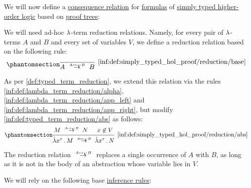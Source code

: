 \begin{definition}\label{def:simply_typed_hol_proof_tree}\mimprovised
  We will now define a \hyperref[def:consequence_relation]{consequence relation} for \hyperref[def:simply_typed_hol_formula]{formulas} of \hyperref[def:simply_typed_hol]{simply typed higher-order logic} based on \hyperref[def:proof_tree]{proof trees}:

  \begin{thmenum}[series=def:simply_typed_hol_proof_tree]
     We will need ad-hoc \( {\mathrm \lambda} \)-term reduction relations. Namely, for every pair of \( {\mathrm \lambda} \)-terms \( A \) and \( B \) and every set of variables \( V \), we define a reduction relation based on the following rule:
    \begin{equation*}\taglabel[\ensuremath{ \logic{Red}_{A \mapsto_V B} }]{inf:def:simply_typed_hol_proof/reduction/base}
      \begin{prooftree}
        \infer0[\ref{inf:def:simply_typed_hol_proof/reduction/base}]{ A \redrel{A \mapsto_V B} B }.
      \end{prooftree}
    \end{equation*}

    As per \cref{def:typed_term_reduction}, we extend this relation via the rules \ref{inf:def:lambda_term_reduction/alpha}, \ref{inf:def:lambda_term_reduction/app_left} and \ref{inf:def:lambda_term_reduction/app_right}, but modify \ref{inf:def:typed_term_reduction/abs} as follows:
    \begin{equation*}\taglabel[\ensuremath{ \logic{Abs}_{A \mapsto_V B} }]{inf:def:simply_typed_hol_proof/reduction/abs}
      \begin{prooftree}
        \hypo{ M \redrel{A \mapsto_V B} N }
        \hypo{ x \not\in V }
        \infer2[\ref{inf:def:simply_typed_hol_proof/reduction/abs}]{ \qabs {x^\tau} M \redrel{A \mapsto_V B} \qabs {x^\tau} N }.
      \end{prooftree}
    \end{equation*}

    The reduction relation \( {\redrel{A \mapsto_V B}} \) replaces a single occurrence of \( A \) with \( B \), as long as it is not in the body of an abstraction whose variable lies in \( V \).

     We will rely on the following base \hyperref[def:inference_rule]{inference rules}:


\end{thmenum}
\end{definition}
